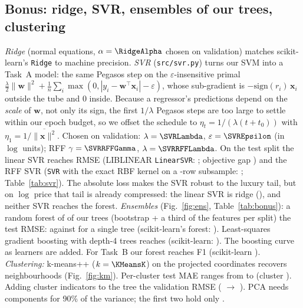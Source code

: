 \documentclass[10pt,twocolumn,a4paper]{article}
\newcommand{\gen}[1]{}
\newcommand{\fit}[1]{\resizebox{\ifdim\width>\linewidth\linewidth\else\width\fi}{!}{#1}}
\newcommand{\vect}[1]{\mathbf{#1}}
\begin{document}
\subsection{Bonus: ridge, SVR, ensembles of our trees, clustering}
\emph{Ridge} (normal equations, $\alpha=\RidgeAlpha$ chosen on
validation) matches scikit-learn's \texttt{Ridge} to machine precision.
\emph{SVR} (\texttt{src/svr.py}) turns our SVM into a Task~A model: the
same Pegasos step on the $\varepsilon$-insensitive primal
$\frac{\lambda}{2}\lVert\vect w\rVert^2+\frac1n\sum_i
\max(0,|y_i-\vect w^\top\vect x_i|-\varepsilon)$, whose sub-gradient is
$-\mathrm{sign}(r_i)\,\vect x_i$ outside the tube and 0 inside. Because a
regressor's predictions depend on the \emph{scale} of $\vect w$, not only
its sign, the first $1/\lambda$ Pegasos steps are too large to settle
within our epoch budget, so we offset the schedule to
$\eta_t=1/(\lambda(t+t_0))$ with $\eta_1=1/\overline{\lVert\vect
x\rVert^2}$. Chosen on validation: $\lambda=\SVRLambda$,
$\varepsilon=\SVREpsilon$ (in $\log$ units); RFF $\gamma=\SVRRFFGamma$,
$\lambda=\SVRRFFLambda$. On the test split the linear SVR reaches RMSE
\SVRRMSE{} (LIBLINEAR \texttt{LinearSVR}: \SkSVRRMSE; objective gap
\SVRObjGap) and the RFF SVR \RFFSVRRMSE{} (\texttt{SVR} with the exact
RBF kernel on a \SVRSubsample-row subsample: \SkKSVRRMSE;
Table~\ref{tab:svr}). The absolute loss makes the SVR robust to the luxury
tail, but on $\log$ price that tail is already compressed: the linear SVR
is \SVRVsRidgeWord{} ridge (\RidgeRMSE), and neither SVR reaches the
forest.
\emph{Ensembles} (Fig.~\ref{fig:ens}, Table~\ref{tab:bonus}): a random
forest of \RFTrees{} of our trees (bootstrap + a third of the features per
split) \ForestVsTreeWord{} the test RMSE: \RFRMSE{} against \OurTreeRMSE{}
for a single tree (scikit-learn's forest: \SkRFRMSE). Least-squares gradient boosting with
\GBTrees{} depth-4 trees reaches \GBRMSE{} (scikit-learn: \SkGBRMSE).
The boosting curve \BoostCurveVerdict{} as learners are added. For Task~B
our forest reaches F1 \RFClfFOne{} (scikit-learn \SkRFClfFOne).
\emph{Clustering:} k-means++ ($k=\KMeansK$) on the projected coordinates
recovers neighbourhoods (Fig.~\ref{fig:km}). Per-cluster test MAE ranges
from \BestClusterMAE{} to \WorstClusterMAE{} (cluster \WorstClusterID).
Adding cluster indicators to the tree \AblationWord{} the validation
RMSE (\AblationWithout{} $\to$ \AblationWith). PCA needs \PCANinety{}
components for 90\% of the variance; the first two hold only
\PCATwoShare.

\begin{table}[t]
  \centering
  \caption{Bonus models on Task A (test split).}
  \label{tab:bonus}
  \fit{\gen{tab_bonus}}
\end{table}
\end{document}
